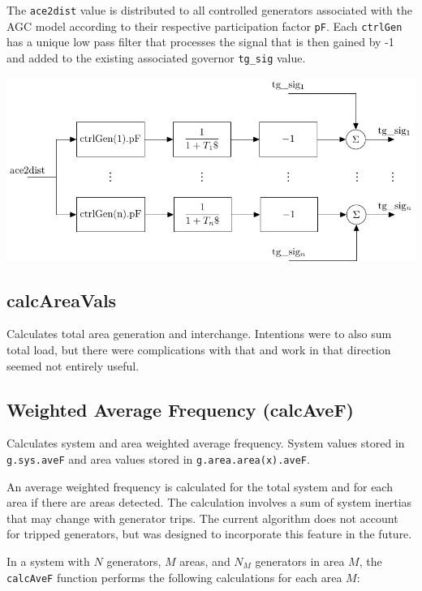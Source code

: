 The \verb|ace2dist| value is distributed to all controlled generators associated with the AGC model according to their respective participation factor \verb|pF|.
Each \verb|ctrlGen| has a unique low pass filter that processes the signal that is then gained by -1 and added to the existing associated governor \verb|tg_sig| value.

\begin{center}
\includegraphics[width=.75\linewidth]{sections/agc/200722-AGCblockdiagram-p3}
\end{center}

\subsection{calcAreaVals}  
Calculates total area generation and interchange.
Intentions were to also sum total load, but there were complications with that and work in that direction seemed not entirely useful.

\subsection{Weighted Average Frequency (calcAveF)} 
Calculates system and area weighted average frequency.
System values stored in \verb|g.sys.aveF| and area values stored in \verb|g.area.area(x).aveF|.

An average weighted frequency is calculated for the total system and for each area if there are areas detected.
The calculation involves a sum of system inertias that may change with generator trips.
The current algorithm does not account for tripped generators, but was designed to incorporate this feature in the future.

\vspace{1em}
In a system with $N$ generators, $M$ areas, and $N_M$ generators in area $M$, the \verb|calcAveF| function performs the following calculations for each area $M$:

